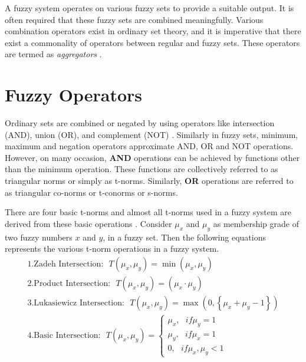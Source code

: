 A fuzzy system operates on various fuzzy sets to provide a suitable output. It is often required that these fuzzy sets are combined meaningfully. Various combination operators exist in ordinary set theory, and it is imperative that there exist a commonality of operators between regular and fuzzy sets. These operators are termed as \textit{aggregators} \cite{Nguyen2003}.

\section{Fuzzy Operators}
Ordinary sets are combined or negated by using operators like intersection (AND), union (OR), and complement (NOT) \cite{Nguyen2003}. Similarly in fuzzy sets, minimum, maximum and negation operators approximate AND, OR and NOT operations. However, on many occasion, \textbf{AND} operations can be achieved by functions other than the minimum operation. These functions are collectively referred to as triangular norms or simply as t\hyp{}norms. Similarly, \textbf{OR} operations are referred to as triangular co\hyp{}norms or t\hyp{}conorms or s\hyp{}norms\cite{Ross2010,bookBogdan2006a}.

There are four basic t\hyp{}norms and almost all t\hyp{}norms used in a fuzzy system are derived from these basic operations \cite{bookBogdan2006a}. Consider $\mu _x$ and $\mu _y$ as membership grade of two fuzzy numbers $ x $ and $ y $, in a fuzzy set. Then the following equations represents the various t\hyp{}norm operations in a fuzzy system.
\[\begin{array}{l}
1. \text{Zadeh Intersection:} ~~~T\left( {{\mu _x},{\mu _y}} \right) = \min \left( {{\mu _x},{\mu _y}} \right)\\
2. \text{Product Intersection:} ~~~T\left( {{\mu _x},{\mu _y}} \right) = \left( {{\mu _x} \cdot {\mu _y}} \right)\\
3. \text{Lukasiewicz Intersection:} ~~~T\left( {{\mu _x},{\mu _y}} \right) = \max \left( {0,\left\{ {{\mu _x} + {\mu _y} - 1} \right\}} \right)\\
4. \text{Basic Intersection:} ~~~T\left( {{\mu _x},{\mu _y}} \right) = \left\{ {\begin{array}{*{20}{c}}
	{{\mu _x},~~~if{\mu _y} = 1}\\
	{{\mu _y},~~~if{\mu _x} = 1}\\
	{0,~~~if{\mu _x},{\mu _y} < 1}
	\end{array}} \right.
\end{array}\]

